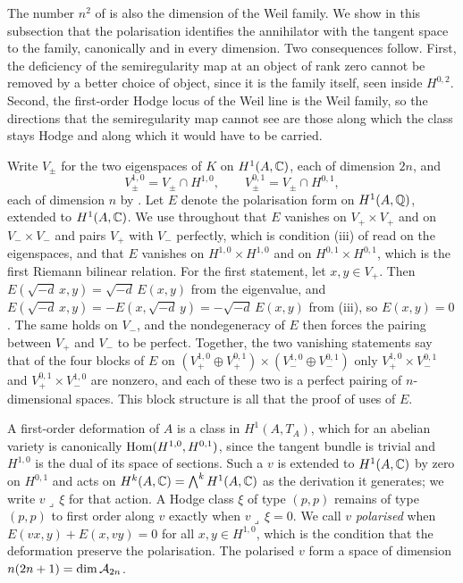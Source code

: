 The number $n^{2}$ of  is also the dimension of the
Weil family. We show in this subsection that the polarisation identifies the
annihilator with the tangent space to the family, canonically and in every
dimension. Two consequences follow. First, the deficiency of the
semiregularity map at an object of rank zero cannot be removed by a better
choice of object, since it is the family itself, seen inside $H^{0,2}$.
Second, the first-order Hodge locus of the Weil line is the Weil family, so
the directions that the semiregularity map cannot see are those along which
the class stays Hodge and along which it would have to be carried.

Write $V_{\pm}$ for the two eigenspaces of $K$ on $H^{1}(A,\mathbb{C})$, each of
dimension $2n$, and
\[
  V_{\pm}^{1,0}=V_{\pm}\cap H^{1,0},\qquad
  V_{\pm}^{0,1}=V_{\pm}\cap H^{0,1},
\]
each of dimension $n$ by . Let $E$ denote the
polarisation form on $H^{1}(A,\mathbb{Q})$, extended to $H^{1}(A,\mathbb{C})$. We use
throughout that $E$ vanishes on $V_{+}\times V_{+}$ and on $V_{-}\times V_{-}$
and pairs $V_{+}$ with $V_{-}$ perfectly, which is condition (iii) of
 read on the eigenspaces, and that $E$ vanishes on
$H^{1,0}\times H^{1,0}$ and on $H^{0,1}\times H^{0,1}$, which is the first
Riemann bilinear relation. For the first statement, let $x,y\in V_{+}$. Then
$E(\sqrt{-d}\,x,y)=\sqrt{-d}\,E(x,y)$ from the eigenvalue, and
$E(\sqrt{-d}\,x,y)=-E(x,\sqrt{-d}\,y)=-\sqrt{-d}\,E(x,y)$ from
(iii), so $E(x,y)=0$. The same holds on $V_{-}$, and the
nondegeneracy of $E$ then forces the pairing between $V_{+}$ and $V_{-}$ to
be perfect. Together, the two vanishing statements say that of the four
blocks of $E$ on
$(V_{+}^{1,0}\oplus V_{+}^{0,1})\times(V_{-}^{1,0}\oplus V_{-}^{0,1})$ only
$V_{+}^{1,0}\times V_{-}^{0,1}$ and $V_{+}^{0,1}\times V_{-}^{1,0}$ are
nonzero, and each of these two is a perfect pairing of $n$-dimensional
spaces. This block structure is all that the proof of 
uses of $E$.

A first-order deformation of $A$ is a class in $H^{1}(A,T_{A})$, which for an
abelian variety is canonically $\operatorname{Hom}(H^{1,0},H^{0,1})$, since the tangent
bundle is trivial and $H^{1,0}$ is the dual of its space of sections. Such a
$v$ is extended to $H^{1}(A,\mathbb{C})$ by zero on $H^{0,1}$ and acts on
$H^{k}(A,\mathbb{C})=\bigwedge^{k}H^{1}(A,\mathbb{C})$ as the derivation it generates; we
write $v\lrcorner\,\xi$ for that action. A Hodge class $\xi$ of type $(p,p)$
remains of type $(p,p)$ to first order along $v$ exactly when
$v\lrcorner\,\xi=0$. We call $v$ \emph{polarised} when
$E(vx,y)+E(x,vy)=0$ for all $x,y\in H^{1,0}$, which is the condition that the
deformation preserve the polarisation. The polarised $v$ form a space of
dimension $n(2n+1)=\dim\mathcal{A}_{2n}$.

